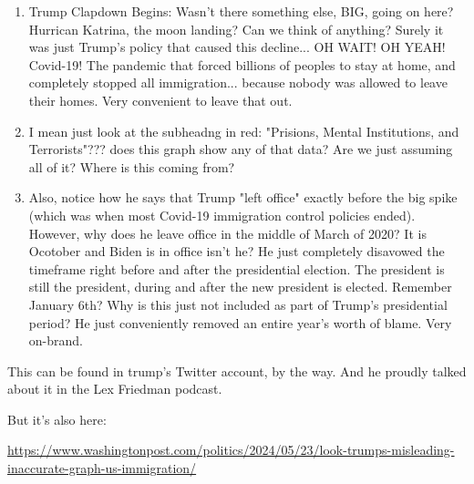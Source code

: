\documentclass{article}
\begin{document}
\begin{enumerate}
  \item Trump Clapdown Begins: Wasn't there something else, BIG, going on here? Hurrican Katrina, the moon landing? 
  Can we think of anything? Surely it was just Trump's policy that caused this decline...
  OH WAIT! OH YEAH! Covid-19! The pandemic that forced billions of peoples to stay at home, and
  completely stopped all immigration... because nobody was allowed to leave their homes.
  Very convenient to leave that out. 
  \item I mean just look at the subheadng in red: "Prisions, Mental Institutions, and Terrorists"??? 
  does this graph show any of that data? Are we just assuming all of it? Where is this coming from?
  \item Also, notice how he says that Trump "left office" exactly before the big spike 
  (which was when most Covid-19 immigration control policies ended).
  However, why does he leave office in the middle of March of 2020? It is Ocotober and Biden is in office isn't he?
  He just completely disavowed the timeframe right before and after the presidential election.
  The president is still the president, during and after the new president is elected. Remember January 6th? 
  Why is this just not included as part of Trump's presidential period? He just conveniently removed an entire year's worth of 
  blame. Very on-brand.
\end{enumerate}


This can be found in trump's Twitter account, by the way. And he proudly talked about it in the Lex Friedman podcast.

But it's also here: 

\url{https://www.washingtonpost.com/politics/2024/05/23/look-trumps-misleading-inaccurate-graph-us-immigration/}

\begin{refcontext}[sorting=nyt]
\printbibliography
\end{refcontext}
\end{document}
